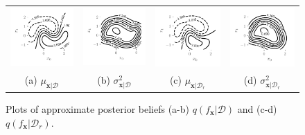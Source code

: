 \documentclass{article}
\theoremstyle{definition}
\newcommand{\mbf}[1]{\mathbf{#1}}
\newcommand{\mcl}[1]{\mathcal{#1}}
\newcommand{\da}{\mcl{D}}
\newcommand{\dc}{\mcl{D}_r}
\begin{document}
\begin{figure}
\begin{tabular}{cccc}
\includegraphics[trim={7mm 8mm 3mm 3mm}, clip,height=0.18\textwidth]{img/moon/moon_full_meanf.pdf}
&
\includegraphics[trim={7mm 8mm 3mm 3mm}, clip,height=0.18\textwidth]{img/moon/moon_full_varf.pdf}
&
\includegraphics[trim={7mm 8mm 3mm 3mm}, clip,height=0.18\textwidth]{img/moon/moon_remain_meanf.pdf}
&
\includegraphics[trim={7mm 8mm 3mm 3mm}, clip,height=0.18\textwidth]{img/moon/moon_remain_varf.pdf}
\\
(a) $\mu_{\mbf{x}|\da}$ 
&
(b) $\sigma^2_{\mbf{x}|\da}$ 
&
(c) $\mu_{\mbf{x}|\dc}$ 
&
(d) $\sigma^2_{\mbf{x}|\dc}$ 
\end{tabular}
\caption{Plots of approximate posterior beliefs (a-b) $q(f_{\mbf{x}}|\da)$ and (c-d) $q(f_{\mbf{x}}|\dc)$.
}
\label{fig:moonfullpost}
\end{figure}
%
\end{document}
